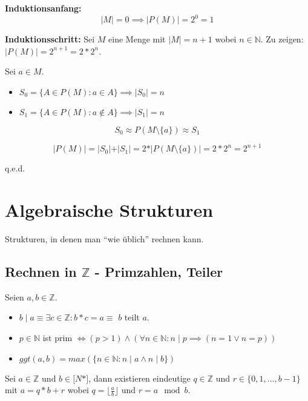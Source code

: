 \documentclass[12pt]{scrreprt}
\newcommand{\qed}{\begin{flushright}q.e.d.\end{flushright}}
\begin{document}
                        \textbf{Induktionsanfang:} \[ \vert M \vert = 0 \implies \vert P(M) \vert = 2 ^ 0 = 1 \]

                        \textbf{Induktionsschritt:} Sei $ M $ eine Menge mit $ \vert M \vert = n + 1 $ wobei $ n \in \mathbb{N} $. Zu zeigen: $ \vert P(M) \vert = 2 ^ { n + 1 } = 2 * 2 ^ n $.

                        Sei $ a \in M $.

                        \begin{itemize}
                            \item $ S _ 0 = \{ A \in P(M) : a \in A \} \implies \vert S _ 0 \vert = n $
                            \item $ S _ 1 = \{ A \in P(M) : a \not\in A \} \implies \vert S _ 1 \vert = n $
                        \end{itemize}

                        \[ S _ 0 \approx P(M \setminus \{ a \}) \approx S _1 \]

                        \[ \vert P(M) \vert = \vert S _ 0 \vert + \vert S _ 1 \vert = 2 * \vert P(M \setminus \{ a \}) \vert = 2 * 2 ^ n = 2 ^ { n + 1 } \]

                        \qed



    \chapter{Algebraische Strukturen}
        \label{c:strukturen}

        Strukturen, in denen man "`wie üblich"' rechnen kann.

        \section{Rechnen in $ \mathbb{Z} $ - Primzahlen, Teiler}
            \label{s:strukturen_rechnen}

            Seien $ a, b \in \mathbb{Z} $.

            \begin{itemize}
                \item $ b \mid a \equiv \exists c \in \mathbb{Z} : b * c = a \equiv $ $ b $ teilt $ a $.
                \item $ p \in \mathbb{N} $ ist prim $ \iff (p > 1) \land (\forall n \in \mathbb{N} : n \mid p \implies (n = 1 \lor n = p)) $
                \item $ ggt(a, b) = max(\{ n \in \mathbb{N} : n \mid a \land n \mid b \}) $
            \end{itemize}

            Sei $ a \in \mathbb{Z} $ und $ b \in \mathbb[N*] $, dann existieren eindeutige $ q \in \mathbb{Z} $ und $ r \in \{ 0, 1, \dots, b - 1 \} $ mit $ a = q * b + r $ wobei $ q = \lfloor \frac{a}{b} \rfloor $ und $ r = a \mod b $.
\end{document}
